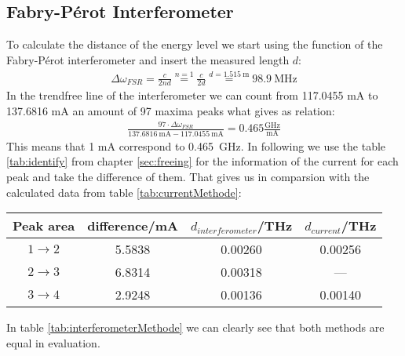 \subsection*{Fabry-Pérot Interferometer}
To calculate the distance of the energy level we start using the function of the Fabry-Pérot interferometer and insert the measured length $d$:
\begin{gather}
    \Delta\omega_{FSR} = \frac{c}{2nd} \overset{n=1}{=} \frac{c}{2d} \overset{d=\SI{1.515}{\metre}}{=} \SI{98.9}{\mega\hertz} 
\end{gather}
In the trendfree line of the interferometer we can count from 117.0455 mA to 137.6816 mA an amount of 97 maxima peaks what gives as relation:
\begin{gather}
    \frac{97\cdot \Delta\omega_{FSR}}{\SI{137.6816}{\milli\ampere}-\SI{117.0455}{\milli\ampere}} = 0.465\frac{\si{\giga\hertz}}{\si{\milli\ampere}}
\end{gather}
This means that 1 mA correspond to \SI{0.465}{\giga\hertz}. In following we use the table \ref{tab:identify} from chapter \ref{sec:freeing} for the information of the current for each peak and take the difference of them. That gives us in comparsion with the calculated data from table \ref{tab:currentMethode}:
\begin{center}
    \begin{tabular}{c | c c c}
        Peak area & difference/mA & $d_{interferometer}$/THz & $d_{current}$/THz\\
        \hline
        $1 \rightarrow 2$ & 5.5838 & 0.00260 & 0.00256\\
        $2 \rightarrow 3$ & 6.8314 & 0.00318 &   ---  \\
        $3 \rightarrow 4$ & 2.9248 & 0.00136 & 0.00140\\
    \end{tabular}
    \label{tab:interferometerMethode}
\end{center} 
In table \ref{tab:interferometerMethode} we can clearly see that both methods are equal in evaluation.
\newpage
